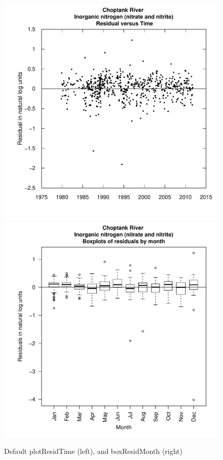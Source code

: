 \documentclass[a4paper,11pt]{article}\usepackage{graphicx, color}
\newenvironment{knitrout}{}{} %
\begin{document}
\begin{knitrout}
\color{fgcolor}\begin{figure}[]

\includegraphics[width=.5\linewidth,height=.5\linewidth]{figure/boxResidMonth1} 
\includegraphics[width=.5\linewidth,height=.5\linewidth]{figure/boxResidMonth2} \caption[Default plotResidTime (left), and boxResidMonth (right)]{Default plotResidTime (left), and boxResidMonth (right)\label{fig:boxResidMonth}}
\end{figure}


\end{knitrout}
\end{document}
